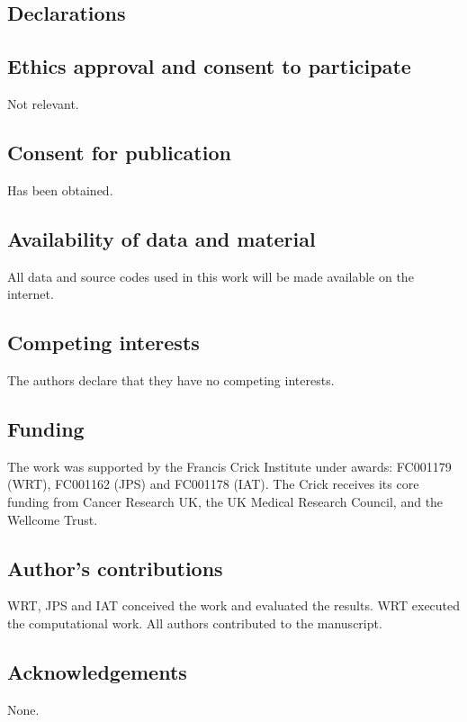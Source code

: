 \documentclass{bmcart}
\begin{document}
\begin{backmatter}

\section*{Declarations}

\subsection*{Ethics approval and consent to participate}
Not relevant.

\subsection*{Consent for publication}
Has been obtained.

\subsection*{Availability of data and material}
All data and source codes used in this work will be made available on the internet.

\subsection*{Competing interests}
The authors declare that they have no competing interests.

\subsection*{Funding}
The work was supported by the Francis Crick Institute under awards: FC001179 (WRT), FC001162 (JPS) and FC001178 (IAT).
The Crick receives its core funding from Cancer Research UK, the UK Medical Research Council, and the Wellcome Trust.

\subsection*{Author's contributions}
WRT, JPS and IAT conceived the work and evaluated the results. 
WRT executed the computational work.  All authors contributed to the manuscript. 

\subsection*{Acknowledgements}
None.



\end{backmatter}
\end{document}
